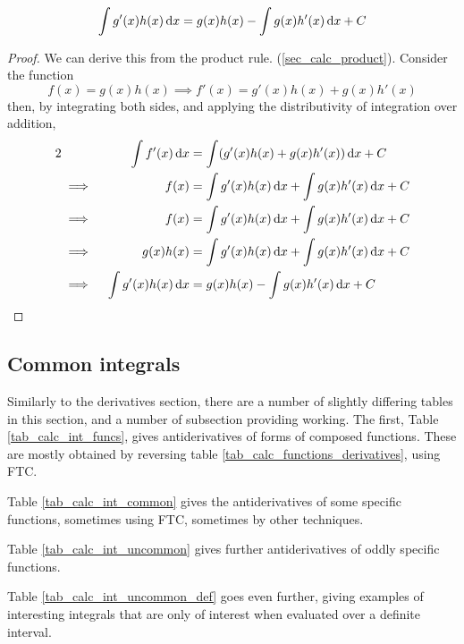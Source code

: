 \begin{theorem}
 \begin{equation*}
  \integ{g'(x)h(x)}{x} = g(x)h(x) - \integ{g(x)h'(x)}{x} + C
 \end{equation*}
\end{theorem}
\begin{proof}
 We can derive this from the product rule.
 (\ref{sec_calc_product}).  Consider the function
 \begin{equation*}
  f(x) = g(x) h(x) \implies f'(x) = g'(x) h(x) + g(x) h'(x)
 \end{equation*}
 then, by integrating both sides, and applying the distributivity of
 integration over addition,
 \begin{alignat*} 2
  && \integ{f'(x)}{x} &= \integ{(g'(x)h(x) + g(x)h'(x))}{x} + C \\
  &\implies{}& f(x) &= \integ{g'(x)h(x)}{x} + \integ{g(x)h'(x)}{x} + C \\
  &\implies{}& f(x) &= \integ{g'(x)h(x)}{x} + \integ{g(x)h'(x)}{x} + C \\
  &\implies{}& g(x)h(x)
      &= \integ{g'(x)h(x)}{x} + \integ{g(x)h'(x)}{x} + C \\
  &\implies{}& \integ{g'(x)h(x)}{x}
      &= g(x)h(x) - \integ{g(x)h'(x)}{x} + C \qedhere \\
 \end{alignat*}
\end{proof}

\subsection{Common integrals}

Similarly to the derivatives section, there are a number of slightly differing
tables in this section, and a number of subsection providing working. The first,
Table \ref{tab_calc_int_funcs}, gives antiderivatives of forms of composed
functions.  These are mostly obtained by reversing table
\ref{tab_calc_functions_derivatives}, using FTC.

Table \ref{tab_calc_int_common} gives the antiderivatives of some specific
functions, sometimes using FTC, sometimes by other techniques.

Table \ref{tab_calc_int_uncommon} gives further antiderivatives of oddly
specific functions.

Table \ref{tab_calc_int_uncommon_def} goes even further, giving examples of
interesting integrals that are only of interest when evaluated over a definite
interval.

